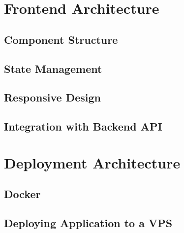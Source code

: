 \section{Frontend Architecture}
\subsection*{Component Structure}
\subsection*{State Management}
\subsection*{Responsive Design}
\subsection*{Integration with Backend API}

\section{Deployment Architecture}
\subsection*{Docker}
\subsection*{Deploying Application to a VPS}